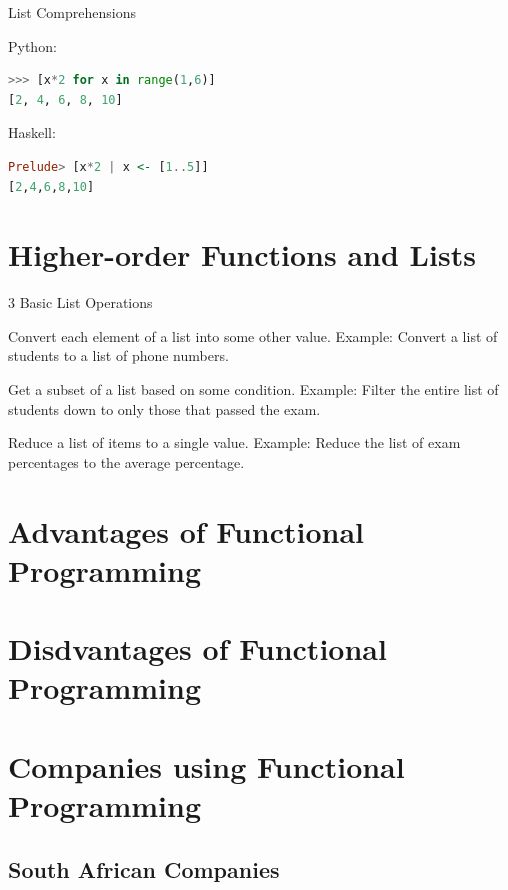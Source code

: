 \documentclass{beamer}
\begin{document}
\begin{frame}[fragile]{List Comprehensions}

Python:
  \begin{lstlisting}[language=Python]
>>> [x*2 for x in range(1,6)]
[2, 4, 6, 8, 10]
  \end{lstlisting}

Haskell:
  \begin{lstlisting}[language=Haskell]
Prelude> [x*2 | x <- [1..5]]
[2,4,6,8,10]
  \end{lstlisting}

\end{frame}

\section{Higher-order Functions and Lists}

\begin{frame}{3 Basic List Operations}

  \begin{description}[<+->]
  \item[Map] Convert each element of a list into some other value.
    Example: Convert a list of students to a list of phone numbers.
  \item[Filter] Get a subset of a list based on some condition.
    Example: Filter the entire list of students down to only those
    that passed the exam.
  \item[Fold] Reduce a list of items to a single value.
    Example: Reduce the list of exam percentages to the average percentage.
  \end{description}

\end{frame}

\section{Advantages of Functional Programming}

\section{Disdvantages of Functional Programming}

\section{Companies using Functional Programming}
\subsection{South African Companies}
\end{document}

